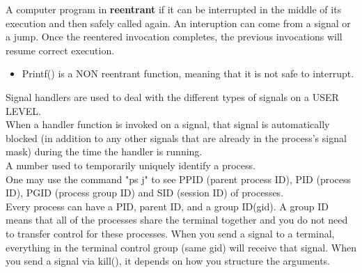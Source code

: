 

A computer program in {\bf reentrant} if it can be interrupted in the middle of its execution and then safely called again.  An interuption can come from a signal or a jump.  Once the reentered invocation completes, the previous invocations will resume correct execution.

\begin{itemize}
\item Printf() is a NON reentrant function, meaning that it is not safe to interrupt.
\end{itemize}

Signal handlers are used to deal with the different types of signals on a USER LEVEL.\\

When a handler function is invoked on a signal, that signal is automatically blocked (in addition to any other signals that are already in the process's signal mask) during the time the handler is running. \\




A number used to temporarily uniquely identify a process.\\
One may use the command "ps j" to see PPID (parent process ID), PID (process ID), PGID (process group ID) and SID (session ID) of processes.   \\

Every process can have a PID, parent ID, and a group ID(gid).  A group ID means that all of the processes share the terminal together and you do not need to transfer control for these processes.  When you send a signal to a terminal, everything in the terminal control group (same gid) will receive that signal. When you send a signal via kill(), it depends on how you structure the arguments.
